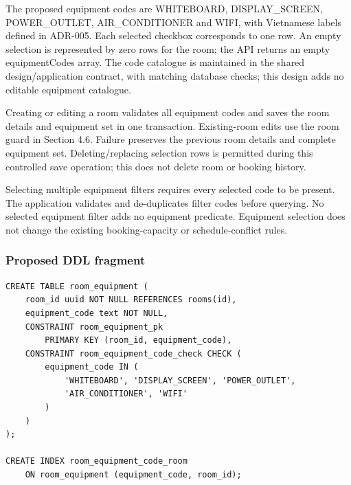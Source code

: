 \vspace{2mm}

The proposed equipment codes are WHITEBOARD, DISPLAY\allowbreak\_\allowbreak{}SCREEN, POWER\allowbreak\_\allowbreak{}OUTLET, AIR\allowbreak\_\allowbreak{}CONDITIONER and WIFI, with Vietnamese labels defined in ADR-005. Each selected checkbox corresponds to one row. An empty selection is represented by zero rows for the room; the API returns an empty equipmentCodes array. The code catalogue is maintained in the shared design/\allowbreak{}application contract, with matching database checks; this design adds no editable equipment catalogue.\par

Creating or editing a room validates all equipment codes and saves the room details and equipment set in one transaction. Existing-room edits use the room guard in Section 4.6. Failure preserves the previous room details and complete equipment set. Deleting/\allowbreak{}replacing selection rows is permitted during this controlled save operation; this does not delete room or booking history.\par

Selecting multiple equipment filters requires every selected code to be present. The application validates and de-duplicates filter codes before querying. No selected equipment filter adds no equipment predicate. Equipment selection does not change the existing booking-capacity or schedule-conflict rules.\par

\subsubsection{Proposed DDL fragment}

\begingroup
\small
\begin{samepage}
\begin{verbatim}
CREATE TABLE room_equipment (
    room_id uuid NOT NULL REFERENCES rooms(id),
    equipment_code text NOT NULL,
    CONSTRAINT room_equipment_pk
        PRIMARY KEY (room_id, equipment_code),
    CONSTRAINT room_equipment_code_check CHECK (
        equipment_code IN (
            'WHITEBOARD', 'DISPLAY_SCREEN', 'POWER_OUTLET',
            'AIR_CONDITIONER', 'WIFI'
        )
    )
);

CREATE INDEX room_equipment_code_room
    ON room_equipment (equipment_code, room_id);
\end{verbatim}
\end{samepage}
\endgroup

